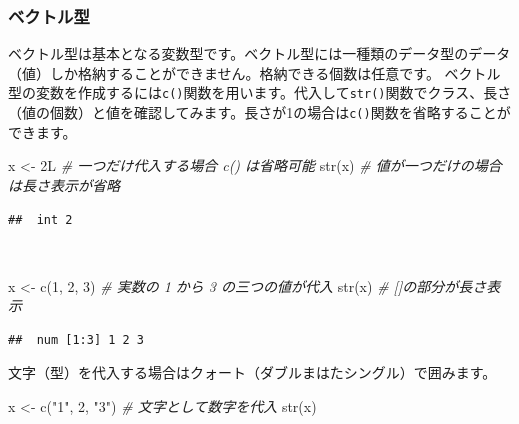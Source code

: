\documentclass[
  12pt,
]{book}
\newenvironment{Shaded}{\begin{snugshade}}{\end{snugshade}}
\newcommand{\CommentTok}[1]{\textcolor[rgb]{0.56,0.35,0.01}{\textit{#1}}}
\newcommand{\DecValTok}[1]{\textcolor[rgb]{0.00,0.00,0.81}{#1}}
\newcommand{\FunctionTok}[1]{\textcolor[rgb]{0.00,0.00,0.00}{#1}}
\newcommand{\NormalTok}[1]{#1}
\newcommand{\OtherTok}[1]{\textcolor[rgb]{0.56,0.35,0.01}{#1}}
\newcommand{\StringTok}[1]{\textcolor[rgb]{0.31,0.60,0.02}{#1}}
\begin{document}
\hypertarget{ux30d9ux30afux30c8ux30ebux578b}{%
\subsubsection{ベクトル型}\label{ux30d9ux30afux30c8ux30ebux578b}}

ベクトル型は基本となる変数型です。ベクトル型には一種類のデータ型のデータ（値）しか格納することができません。格納できる個数は任意です。 ベクトル型の変数を作成するには\texttt{c()}関数を用います。代入して\texttt{str()}関数でクラス、長さ（値の個数）と値を確認してみます。長さが1の場合は\texttt{c()}関数を省略することができます。

\begin{Shaded}
\begin{Highlighting}[numbers=left,,]
\NormalTok{x }\OtherTok{\textless{}{-}}\NormalTok{ 2L                 }\CommentTok{\# 一つだけ代入する場合 \textasciigrave{}c()\textasciigrave{} は省略可能}
\FunctionTok{str}\NormalTok{(x)                  }\CommentTok{\# 値が一つだけの場合は長さ表示が省略}
\end{Highlighting}
\end{Shaded}

\begin{verbatim}
##  int 2
\end{verbatim}

　

\begin{Shaded}
\begin{Highlighting}[numbers=left,,]
\NormalTok{x }\OtherTok{\textless{}{-}} \FunctionTok{c}\NormalTok{(}\DecValTok{1}\NormalTok{, }\DecValTok{2}\NormalTok{, }\DecValTok{3}\NormalTok{)         }\CommentTok{\# 実数の 1 から 3 の三つの値が代入}
\FunctionTok{str}\NormalTok{(x)                  }\CommentTok{\# []の部分が長さ表示}
\end{Highlighting}
\end{Shaded}

\begin{verbatim}
##  num [1:3] 1 2 3
\end{verbatim}

文字（型）を代入する場合はクォート（ダブルまはたシングル）で囲みます。

\begin{Shaded}
\begin{Highlighting}[numbers=left,,]
\NormalTok{x }\OtherTok{\textless{}{-}} \FunctionTok{c}\NormalTok{(}\StringTok{"1"}\NormalTok{, }\StringTok{\textquotesingle{}2\textquotesingle{}}\NormalTok{, }\StringTok{"3"}\NormalTok{)   }\CommentTok{\# 文字として数字を代入}
\FunctionTok{str}\NormalTok{(x)}
\end{Highlighting}
\end{Shaded}
\end{document}
